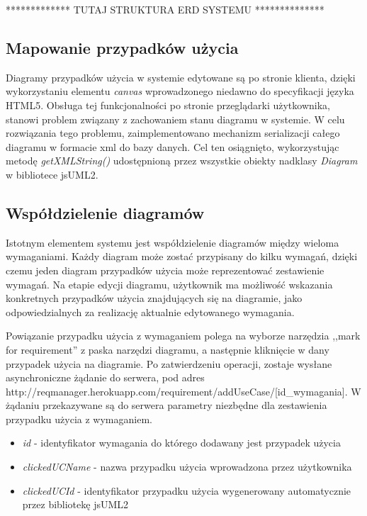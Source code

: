     ************* TUTAJ STRUKTURA ERD SYSTEMU **************

    \subsection{Mapowanie przypadków użycia}
      Diagramy przypadków użycia w systemie edytowane są po stronie klienta, dzięki wykorzystaniu elementu \emph{canvas} wprowadzonego niedawno do specyfikacji języka HTML5. Obsługa tej funkcjonalności po stronie przeglądarki użytkownika, stanowi problem związany z zachowaniem stanu diagramu w systemie. W celu rozwiązania tego problemu, zaimplementowano mechanizm serializacji całego diagramu w formacie xml do bazy danych. Cel ten osiągnięto, wykorzystując metodę \emph{getXMLString()} udostępnioną przez wszystkie obiekty nadklasy \emph{Diagram} w bibliotece jsUML2. 
      

    \subsection{Współdzielenie diagramów}

    Istotnym elementem systemu jest współdzielenie diagramów między wieloma wymaganiami. Każdy diagram może zostać przypisany do kilku wymagań, dzięki czemu jeden diagram przypadków użycia może reprezentować zestawienie wymagań. Na etapie edycji diagramu, użytkownik ma możliwość wskazania konkretnych przypadków użycia znajdujących się na diagramie, jako odpowiedzialnych za realizację aktualnie edytowanego wymagania.

    Powiązanie przypadku użycia z wymaganiem polega na wyborze narzędzia ,,mark for requirement'' z paska narzędzi diagramu, a następnie kliknięcie w dany przypadek użycia na diagramie. Po zatwierdzeniu operacji, zostaje wysłane asynchroniczne żądanie do serwera, pod adres http://reqmanager.herokuapp.com/requirement/addUseCase/[id_wymagania]. W żądaniu przekazywane są do serwera parametry niezbędne dla zestawienia przypadku użycia z wymaganiem. 

    \begin{itemize}
      \item \emph{id} - identyfikator wymagania do którego dodawany jest przypadek użycia
      \item \emph{clickedUCName} - nazwa przypadku użycia wprowadzona przez użytkownika
      \item \emph{clickedUCId} - identyfikator przypadku użycia wygenerowany automatycznie przez bibliotekę jsUML2
    \end{itemize}

